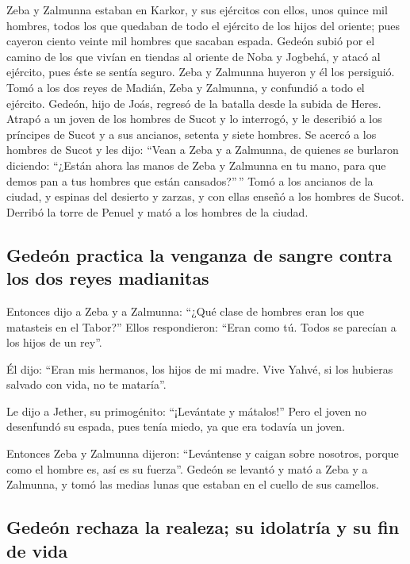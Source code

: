  Zeba y Zalmunna estaban en Karkor, y sus ejércitos con
ellos, unos quince mil hombres, todos los que quedaban de todo el
ejército de los hijos del oriente; pues cayeron ciento veinte mil
hombres que sacaban espada.  Gedeón subió por el camino
de los que vivían en tiendas al oriente de Noba y Jogbehá, y atacó al
ejército, pues éste se sentía seguro.  Zeba y Zalmunna
huyeron y él los persiguió. Tomó a los dos reyes de Madián, Zeba y
Zalmunna, y confundió a todo el ejército.  Gedeón, hijo
de Joás, regresó de la batalla desde la subida de Heres. 
Atrapó a un joven de los hombres de Sucot y lo interrogó, y le describió
a los príncipes de Sucot y a sus ancianos, setenta y siete hombres.
 Se acercó a los hombres de Sucot y les dijo: ``Vean a
Zeba y a Zalmunna, de quienes se burlaron diciendo: ``¿Están ahora las
manos de Zeba y Zalmunna en tu mano, para que demos pan a tus hombres
que están cansados?''\,''  Tomó a los ancianos de la
ciudad, y espinas del desierto y zarzas, y con ellas enseñó a los
hombres de Sucot.  Derribó la torre de Penuel y mató a
los hombres de la ciudad.

\hypertarget{gedeuxf3n-practica-la-venganza-de-sangre-contra-los-dos-reyes-madianitas}{%
\subsection{Gedeón practica la venganza de sangre contra los dos reyes
madianitas}\label{gedeuxf3n-practica-la-venganza-de-sangre-contra-los-dos-reyes-madianitas}}

 Entonces dijo a Zeba y a Zalmunna: ``¿Qué clase de
hombres eran los que matasteis en el Tabor?'' Ellos respondieron: ``Eran
como tú. Todos se parecían a los hijos de un rey''.

 Él dijo: ``Eran mis hermanos, los hijos de mi madre.
Vive Yahvé, si los hubieras salvado con vida, no te mataría''.

 Le dijo a Jether, su primogénito: ``¡Levántate y
mátalos!'' Pero el joven no desenfundó su espada, pues tenía miedo, ya
que era todavía un joven.

 Entonces Zeba y Zalmunna dijeron: ``Levántense y caigan
sobre nosotros, porque como el hombre es, así es su fuerza''. Gedeón se
levantó y mató a Zeba y a Zalmunna, y tomó las medias lunas que estaban
en el cuello de sus camellos.

\hypertarget{gedeuxf3n-rechaza-la-realeza-su-idolatruxeda-y-su-fin-de-vida}{%
\subsection{Gedeón rechaza la realeza; su idolatría y su fin de
vida}\label{gedeuxf3n-rechaza-la-realeza-su-idolatruxeda-y-su-fin-de-vida}}

